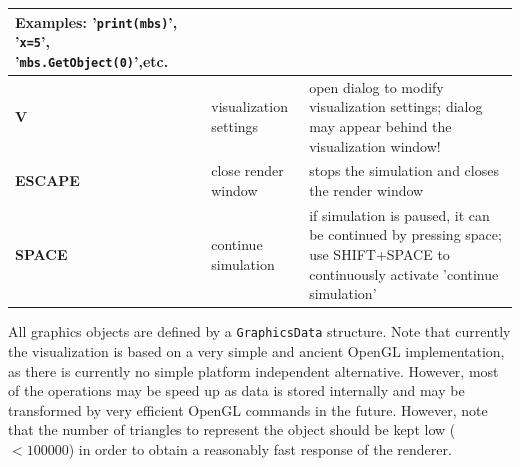 \documentclass[11pt,a4paper]{book}
\newcommand{\refSection}[1]{\hyperref[#1]{\underline{Section \ref*{#1}}}} %
\begin{document}
\begin{center}
\begin{longtable}{| p{4cm} | p{4cm} | p{8cm} |}
	Examples: '\texttt{print(mbs)}', '\texttt{x=5}', '\texttt{mbs.GetObject(0)}',etc.\\ \hline
	\bf V & visualization settings & open dialog to modify visualization settings; dialog may appear behind the visualization window! \\ \hline
  \bf ESCAPE & close render window & stops the simulation and closes the render window \\ \hline
  \bf SPACE & continue simulation & if simulation is paused, it can be continued by pressing space; use SHIFT+SPACE to continuously activate 'continue simulation'\\ \hline
  \end{longtable}
\end{center}

\label{sec:graphicsData}
All graphics objects are defined by a \texttt{GraphicsData} structure.%
Note that currently the visualization is based on a very simple and ancient OpenGL implementation, as there is currently no simple platform independent alternative. However, most of the operations may be speed up as data is stored internally and may be transformed by very efficient OpenGL commands in the future. However, note that the number of triangles to represent the object should be kept low ($<100000$) in order to obtain a reasonably fast response of the renderer.
\end{document}
